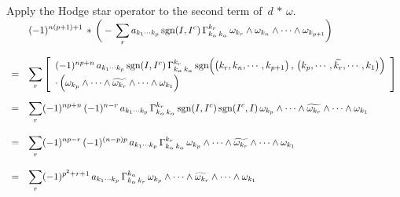 \documentclass{article}[12pt,a4paper]
\begin{document}
Apply the Hodge star operator to the second term of \,$d\, \ast \,\omega$. \\[0.1in]
$\begin{array}{rl}
&\displaystyle 
	(-1)^{n(p+1)+1}\, \ast\,\bigg( 
	-\, \sum_{r} a_{k_1\cdots k_p} \, \mbox{sgn}(I, I^c)\, \Gamma_{k_\alpha \, k_\alpha}^{k_r} \,
	\omega_{k_r} \wedge \omega_{k_n} \wedge\cdots\wedge \omega_{k_{p+1}} \bigg) \\[0.3in]
=& \displaystyle 
	\sum_{r} \left[\begin{array}{l}
		(-1)^{np+n} \, a_{k_1\cdots k_p} \, \mbox{sgn}(I, I^c)\, \Gamma_{k_\alpha \, k_\alpha}^{k_r} \,
		\mbox{sgn}\Big(\big(k_r, k_n, \cdots, k_{p+1}\big)\,,\,\big(k_p, \cdots, \widetilde{k_r}, \cdots, k_1\big)\Big) \\
		\cdot \, \Big(\omega_{k_p} \wedge\cdots\wedge \widetilde{\omega_{k_r}} \wedge\cdots\wedge \omega_{k_1}\Big) 
	\end{array}\right] \\[0.3in]
=& \displaystyle 
	\sum_{r} (-1)^{np+n}\, (-1)^{n-r}\, a_{k_1\cdots k_p} \, \Gamma_{k_\alpha \, k_\alpha}^{k_r} \,
	\mbox{sgn}(I, I^c)\, \mbox{sgn}(I^c, I) \,
	\omega_{k_p} \wedge\cdots\wedge \widetilde{\omega_{k_r}} \wedge\cdots\wedge \omega_{k_1} \\[0.3in]
=& \displaystyle 
	\sum_{r} (-1)^{np-r}\, (-1)^{(n-p)p}\, a_{k_1\cdots k_p} \, \Gamma_{k_\alpha \, k_\alpha}^{k_r} \,
	\omega_{k_p} \wedge\cdots\wedge \widetilde{\omega_{k_r}} \wedge\cdots\wedge \omega_{k_1} \\[0.3in]
=& \displaystyle 
	\sum_r (-1)^{p^2+r+1} \, a_{k_1\cdots k_p} \, \Gamma_{k_\alpha \, k_r}^{k_\alpha} \,
	\omega_{k_p} \wedge\cdots\wedge \widetilde{\omega_{k_r}} \wedge\cdots\wedge \omega_{k_1} \\
\end{array}$ \\[0.1in]
\end{document}
